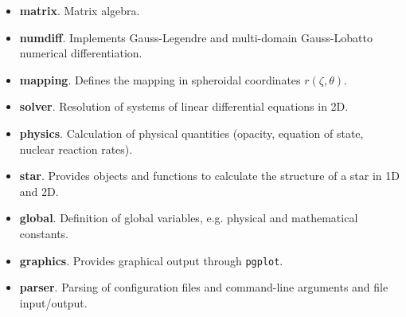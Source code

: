 \begin{itemize}
\item {\bf matrix}. Matrix algebra.
\item {\bf numdiff}. Implements Gauss-Legendre and multi-domain Gauss-Lobatto
numerical differentiation.
\item {\bf mapping}. Defines the mapping in spheroidal coordinates $r(\zeta,\theta)$. 
\item {\bf solver}. Resolution of systems of linear differential equations in 2D.
\item {\bf physics}. Calculation of physical quantities (opacity, equation of state, nuclear reaction rates).
\item {\bf star}. Provides objects and functions to calculate the structure of a star in 1D and 2D.
\item {\bf global}. Definition of global variables, e.g. physical and mathematical constants.
\item {\bf graphics}. Provides graphical output through {\tt pgplot}.
\item {\bf parser}. Parsing of configuration files and command-line arguments and file input/output.
\end{itemize} 


